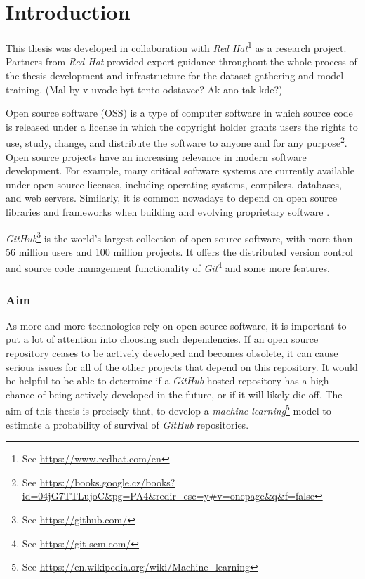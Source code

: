 \chapter*{Introduction}

This thesis was developed in collaboration with \emph{Red Hat}\footnote{See \url{https://www.redhat.com/en}} as a research project.
Partners from \emph{Red Hat} provided expert guidance throughout the whole process of the thesis development and infrastructure for the dataset gathering and model training.
(Mal by v uvode byt tento odstavec? Ak ano tak kde?)

Open source software (OSS) is a type of computer software in which source code is released under a license in which the copyright holder grants users the rights to use, study, change, and distribute the software to anyone and for any purpose\footnote{See \url{https://books.google.cz/books?id=04jG7TTLujoC&pg=PA4&redir_esc=y\#v=onepage&q&f=false}}.
Open source projects have an increasing relevance in modern software development.
For example, many critical software systems are currently available under open source licenses, including operating systems, compilers, databases, and web servers.
Similarly, it is common nowadays to depend on open source libraries and frameworks when building and evolving proprietary software \cite{p:7}.

\emph{GitHub}\footnote{See \url{https://github.com/}} is the world’s largest collection of open source software, with more than 56 million users and 100 million projects.
It offers the distributed version control and source code management functionality of \emph{Git}\footnote{See \url{https://git-scm.com/}} and some more features.

\subsection*{Aim}

As more and more technologies rely on open source software, it is important to put a lot of attention into choosing such dependencies.
If an open source repository ceases to be actively developed and becomes obsolete, it can cause serious issues for all of the other projects that depend on this repository.
It would be helpful to be able to determine if a \emph{GitHub} hosted repository has a high chance of being actively developed in the future, or if it will likely die off.
The aim of this thesis is precisely that, to develop a \emph{machine learning}\footnote{See \url{https://en.wikipedia.org/wiki/Machine_learning}} model to estimate a probability of survival of \emph{GitHub} repositories.

